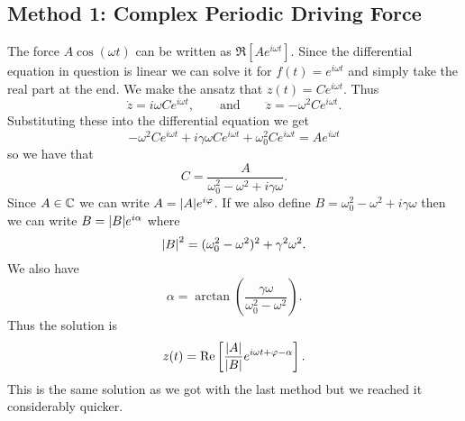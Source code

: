 \documentclass[a4paper]{article}
\begin{document}
    \subsection{Method 1: Complex Periodic Driving Force}
    The force \(A\cos(\omega t)\) can be written as \(\Re[Ae^{i\omega t}]\).
    Since the differential equation in question is linear we can solve it for \(f(t) = e^{i\omega t}\) and simply take the real part at the end.
    We make the ansatz that \(z(t) = Ce^{i\omega t}\).
    Thus
    \[\dot{z} = i\omega Ce^{i\omega t}, \qquad\text{and}\qquad \ddot{z} = -\omega^2Ce^{i\omega t}.\]
    Substituting these into the differential equation we get
    \[-\omega^2Ce^{i\omega t} + i\gamma\omega Ce^{i\omega t} + \omega_0^2Ce^{i\omega t} = Ae^{i\omega t}\]
    so we have that
    \[C = \frac{A}{\omega_0^2 - \omega^2 + i\gamma\omega}.\]
    Since \(A\in\mathbb{C}\) we can write \(A = \abs{A}e^{i\varphi}\).
    If we also define \(B = \omega_0^2 - \omega^2 + i\gamma\omega\) then we can write \(B = \abs{B}e^{i\alpha}\) where
    \[\abs{B}^2 = (\omega_0^2 - \omega^2)^2 + \gamma^2\omega^2.\]
    We also have
    \[\alpha = \arctan\left(\frac{\gamma\omega}{\omega_0^2 - \omega^2}\right).\]
    Thus the solution is
    \[z(t) = \Re\left[\frac{\abs{A}}{\abs{B}}e^{i\omega t + \varphi - \alpha}\right].\]
    This is the same solution as we got with the last method but we reached it considerably quicker.
    
\end{document}
